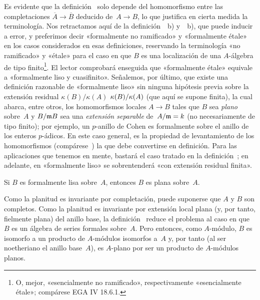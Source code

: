 \begin{remarques}
\label{III.1.2}
Es evidente que la definición~ solo depende del homomorfismo entre las completaciones $\overline{A}\to\overline{B}$ deducido de~$A\to B$, lo que justifica en cierta medida la terminología. Nos retractamos aquí de la definición~~b) y~~b), que puede inducir a error, y preferimos decir «formalmente no ramificado»
%
y «formalmente étale»
%
en los casos considerados en esas definiciones, reservando la terminología «no ramificado» y «étale» para el caso en que $B$ es una localización de una $A$-álgebra de tipo finito\footnote{O, mejor, «esencialmente no ramificado», respectivamente «esencialmente étale»; compárese EGA IV 18.6.1.}.
%
%
El lector comprobará enseguida que «formalmente étale» equivale a «formalmente liso y cuasifinito». Señalemos, por último, que existe una definición razonable de «formalmente liso» sin ninguna hipótesis previa sobre la extensión residual
{$\kappa(B)/\kappa(A)$}
{$\kappa(B)/\kappa(A)$}
(que aquí se supone finita), la cual abarca, entre otros, los homomorfismos locales $A\to B$ tales que $B$ sea \emph{plano} sobre~$A$ y $B/\mathfrak{m}B$ sea una \emph{extensión separable} de~$A/\mathfrak{m}=k$ (no necesariamente de tipo finito); por ejemplo, un $p$-anillo de Cohen es formalmente
sobre el anillo de los enteros $p$-ádicos. En este caso general, es la propiedad de levantamiento de los homomorfismos (compárese~) la que debe convertirse en definición. Para las aplicaciones que tenemos en mente, bastará el caso tratado en la definición~; en adelante, en «formalmente liso» se sobrentenderá «con extensión residual finita».
\end{remarques}

\begin{lemme}
\label{III.1.3}
Si $B$ es formalmente lisa sobre~$A$, entonces $B$ es plana sobre~$A$.
\end{lemme}

{\itshape}{}
Como la planitud es invariante por completación, puede suponerse que $A$ y $B$ son completos. Como la planitud es invariante por extensión local plana (y, por tanto, fielmente plana) del anillo base, la definición~ reduce el problema al caso en que $B$ es un álgebra de series formales sobre~$A$. Pero entonces, como $A$-módulo, $B$ es isomorfo a un producto de $A$-módulos isomorfos a~$A$ y, por tanto (al ser noetheriano el anillo base~$A$), es $A$-plano por ser un producto de $A$-módulos planos.
{\upshape}{}


